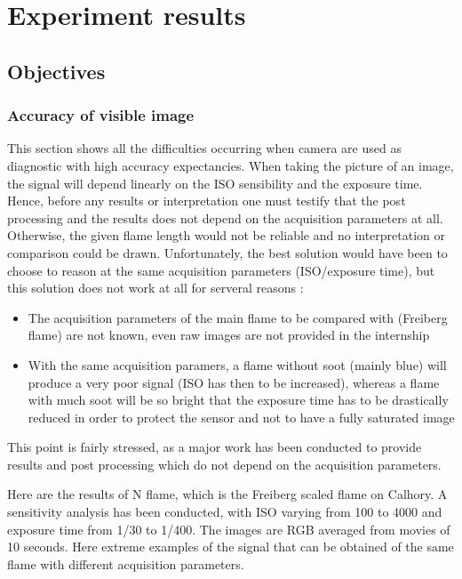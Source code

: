 \renewcommand\evenpagerightmark{{\scshape\small Experiment results}}
\chapter[Experiment results]%
{Experiment results}
\label{experiment_chapt}

\section{Objectives}


\subsection{Accuracy of visible image }

This section shows all the difficulties occurring when camera are used as diagnostic with high accuracy expectancies.  When taking the picture of an image, the signal will depend linearly on the ISO sensibility and the exposure time. Hence, before any results or interpretation one must testify that the post processing and the results does not depend on the acquisition parameters at all. Otherwise, the given flame length would not be reliable and no interpretation or comparison could be drawn. Unfortunately, the best solution would have been to choose to reason at the same acquisition parameters (ISO/exposure time), but this solution does not work at all for serveral reasons :
\begin{itemize}
\item The acquisition parameters of the main flame to be compared with (Freiberg flame) are not known, even raw images are not provided in the internship
\item With the same acquisition paramers, a flame without soot (mainly blue) will produce a very poor signal (ISO has then to be increased), whereas a flame with much soot will be so bright that the exposure time has to be drastically reduced in order to protect the sensor and not to have a fully saturated image
\end{itemize}

This point is fairly stressed, as a major work has been conducted to provide results and post processing which do not depend on the acquisition parameters.

Here are the results of N flame, which is the Freiberg scaled flame on Calhory. A sensitivity analysis has been conducted, with ISO varying from 100 to 4000 and exposure time from 1/30 to 1/400. The images are RGB averaged from movies of 10 seconds. Here extreme examples of the signal that can be obtained of the same flame with different acquisition parameters.


